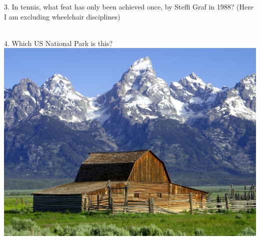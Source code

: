 \begin{frame}
\begin{center}
\Large
3. In tennis, what feat has only been achieved once, by Steffi Graf in 1988? (Here I am excluding wheelchair disciplines)
\\
\\
\end{center}
\end{frame}
\begin{frame}
\begin{center}
\Large
4. Which US National Park is this?
\\
\vspace{0.5em}\includegraphics[height=0.6\paperheight]{images/grand_tetons.jpg}
\\
\end{center}
\end{frame}
